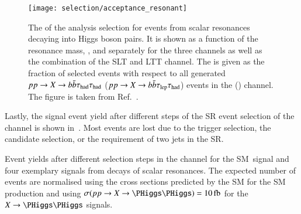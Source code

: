 \begin{figure}[htbp]
  \centering

  \texttt{[image: selection/acceptance\_resonant]}

  \caption[The acceptance times efficiency of the analysis selection for events
  from scalar resonances decaying into Higgs boson pairs.]{The \AccTimesEff of
    the analysis selection for events from scalar resonances decaying into Higgs
    boson pairs. It is shown as a function of the resonance mass, \mX, and
    separately for the three channels as well as the combination of the \lephad
    SLT and LTT channel. The \AccTimesEff is given as the fraction of selected
    events with respect to all generated $pp \to X \to b\bar{b}\tau_{\text{had}}\tau_{\text{had}}$
    ($pp \to X \to b\bar{b}\tau_{\text{lep}}\tau_{\text{had}}$) events in the \hadhad (\lephad) channel. The
    figure is taken from Ref.~\cite{ATLAS-CONF-2021-030}.}%
  \label{fig:signal_acceptance_resonant}
\end{figure}

Lastly, the signal event yield after different steps of the SR event selection
of the \hadhad channel is shown in~. Most events are lost due
to the trigger selection, the \tauhadvis candidate selection, or the requirement
of two \btagged jets in the SR.

\begin{sidewaystable}[p]
  \centering

  \caption[Event yields after different selection steps in the \hadhad channel
  for the SM~\HH signal and four exemplary signals from decays of scalar
  resonances.]{Event yields after different selection steps in the \hadhad
    channel for the SM~\HH signal and four exemplary signals from decays of
    scalar resonances. The expected number of events are normalised using the
    cross sections predicted by the SM for the SM \HH production and using
    $\sigma(pp \to X \to \HH) = \SI{10}{\femto\barn}$ for the $X \to \HH$
    signals.}%
  \label{tab:cutflow}

  \resizebox{\textwidth}{!}{
    
  }
\end{sidewaystable}



